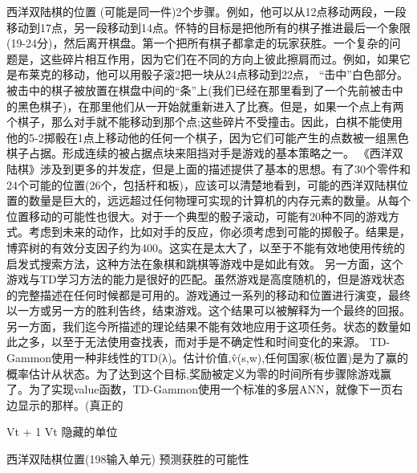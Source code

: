西洋双陆棋的位置
(可能是同一件)2个步骤。例如，他可以从12点移动两段，一段移动到17点，另一段移动到14点。怀特的目标是把他所有的棋子推进最后一个象限(19-24分)，然后离开棋盘。第一个把所有棋子都拿走的玩家获胜。一个复杂的问题是，这些碎片相互作用，因为它们在不同的方向上彼此擦肩而过。例如，如果它是布莱克的移动，他可以用骰子滚2把一块从24点移动到22点，
“击中”白色部分。被击中的棋子被放置在棋盘中间的“条”上(我们已经在那里看到了一个先前被击中的黑色棋子)，在那里他们从一开始就重新进入了比赛。但是，如果一个点上有两个棋子，那么对手就不能移动到那个点;这些碎片不受撞击。因此，白棋不能使用他的5-2掷骰在1点上移动他的任何一个棋子，因为它们可能产生的点数被一组黑色棋子占据。形成连续的被占据点块来阻挡对手是游戏的基本策略之一。
《西洋双陆棋》涉及到更多的并发症，但是上面的描述提供了基本的思想。有了30个零件和24个可能的位置(26个，包括杆和板)，应该可以清楚地看到，可能的西洋双陆棋位置的数量是巨大的，远远超过任何物理可实现的计算机的内存元素的数量。从每个位置移动的可能性也很大。对于一个典型的骰子滚动，可能有20种不同的游戏方式。考虑到未来的动作，比如对手的反应，你必须考虑到可能的掷骰子。结果是，博弈树的有效分支因子约为400。这实在是太大了，以至于不能有效地使用传统的启发式搜索方法，这种方法在象棋和跳棋等游戏中是如此有效。
另一方面，这个游戏与TD学习方法的能力是很好的匹配。虽然游戏是高度随机的，但是游戏状态的完整描述在任何时候都是可用的。游戏通过一系列的移动和位置进行演变，最终以一方或另一方的胜利告终，结束游戏。这个结果可以被解释为一个最终的回报。另一方面，我们迄今所描述的理论结果不能有效地应用于这项任务。状态的数量如此之多，以至于无法使用查找表，而对手是不确定性和时间变化的来源。
TD-Gammon使用一种非线性的TD(λ)。估计价值,v̂(s,w),任何国家(板位置)是为了赢的概率估计从状态。为了达到这个目标,奖励被定义为零的时间所有步骤除游戏赢了。为了实现value函数，TD-Gammon使用一个标准的多层ANN，就像下一页右边显示的那样。(真正的

Vt + 1 Vt
隐藏的单位

西洋双陆棋位置(198输入单元)
预测获胜的可能性


